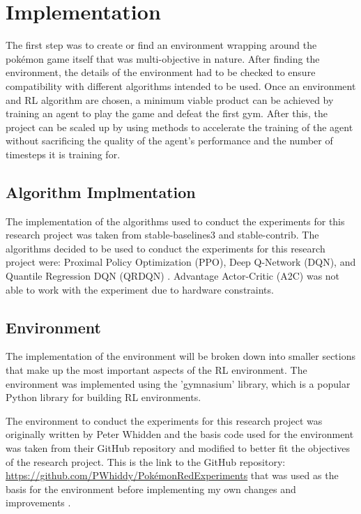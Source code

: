 \section{Implementation}

The first step was to create or find an environment wrapping around the pokémon game itself that was multi-objective in nature. After finding the environment, the details of the environment had to be checked to ensure compatibility with different algorithms intended to be used. Once an environment and RL algorithm are chosen, a minimum viable product can be achieved by training an agent to play the game and defeat the first gym. After this,  the project can be scaled up by using methods to accelerate the training of the agent without sacrificing the quality of the agent's performance and the number of timesteps it is training for. 

\subsection{Algorithm Implmentation}

The implementation of the algorithms used to conduct the experiments for this research project was taken from stable-baselines3 and stable-contrib. The algorithms decided to be used to conduct the experiments for this research project were: Proximal Policy Optimization (PPO), Deep Q-Network (DQN), and Quantile Regression DQN (QRDQN) \cite{stablebaselines3}. Advantage Actor-Critic (A2C) was not able to work with the experiment due to hardware constraints.

\subsection{Environment}

The implementation of the environment will be broken down into smaller sections that make up the most important aspects of the RL environment. The environment was implemented using the 'gymnasium' library, which is a popular Python library for building RL environments.

The environment to conduct the experiments for this research project was originally written by Peter Whidden and the basis code used for the environment was taken from their GitHub repository and modified to better fit the objectives of the research project. This is the link to the GitHub repository: \url{https://github.com/PWhiddy/PokémonRedExperiments} that was used as the basis for the environment before implementing my own changes and improvements \cite{PWhiddy2023}.

